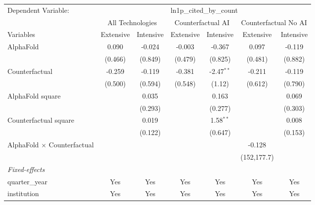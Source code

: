 \begingroup
\centering
\begin{tabular}{lcccccc}
   \tabularnewline \midrule \midrule
   Dependent Variable: & \multicolumn{6}{c}{ln1p\_cited\_by\_count}\\
 & \multicolumn{2}{c}{All Technologies} & \multicolumn{2}{c}{Counterfactual AI} & \multicolumn{2}{c}{Counterfactual No AI} \\
\cmidrule(lr){1-1}\cmidrule(lr){2-3} \cmidrule(lr){4-5} \cmidrule(lr){6-7}
Variables & \multicolumn{1}{c}{Extensive} & \multicolumn{1}{c}{Intensive} & \multicolumn{1}{c}{Extensive} & \multicolumn{1}{c}{Intensive} & \multicolumn{1}{c}{Extensive} & \multicolumn{1}{c}{Intensive} \\
\cmidrule(lr){1-1}\cmidrule(lr){2-2} \cmidrule(lr){3-3} \cmidrule(lr){4-4} \cmidrule(lr){5-5} \cmidrule(lr){6-6} \cmidrule(lr){7-7}
   AlphaFold                          & 0.090   & -0.024  & -0.003  & -0.367       & 0.097       & -0.119\\   
                                      & (0.466) & (0.849) & (0.479) & (0.825)      & (0.481)     & (0.882)\\   
   Counterfactual                     & -0.259  & -0.119  & -0.381  & -2.47$^{**}$ & -0.211      & -0.119\\   
                                      & (0.500) & (0.594) & (0.548) & (1.12)       & (0.612)     & (0.790)\\   
   AlphaFold square                   &         & 0.035   &         & 0.163        &             & 0.069\\   
                                      &         & (0.293) &         & (0.277)      &             & (0.303)\\   
   Counterfactual square              &         & 0.019   &         & 1.58$^{**}$  &             & 0.008\\   
                                      &         & (0.122) &         & (0.647)      &             & (0.153)\\   
   AlphaFold $\times$ Counterfactual  &         &         &         &              & -0.128      &   \\   
                                      &         &         &         &              & (152,177.7) &   \\   
   \midrule
   \emph{Fixed-effects}\\
   quarter\_year                      & Yes     & Yes     & Yes     & Yes          & Yes         & Yes\\  
   institution                        & Yes     & Yes     & Yes     & Yes          & Yes         & Yes\\  

\end{tabular}
